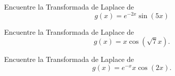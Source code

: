  \begin{resuelto}
  \label{bron:exmp:21.15}
  Encuentre la Transformada de Laplace de
  $$g(x)=e^{-2x}\sin(5x)$$
 \end{resuelto}




 \begin{resuelto}
  \label{bron:exmp:21.16}
  Encuentre la Transformada de Laplace de
  $$g(x)=x\cos(\sqrt{7}x).$$
 \end{resuelto}




 \begin{resuelto}
  \label{bron:exmp:21.17}
  Encuentre la Transformada de Laplace de
  $$g(x)=e^{-x}x\cos(2x).$$
 \end{resuelto}





